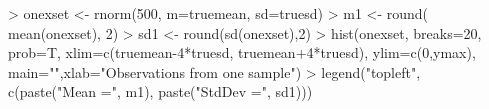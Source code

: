 \begin{Schunk}
\begin{Sinput}
> onexset <- rnorm(500, m=truemean, sd=truesd)
> m1 <- round( mean(onexset), 2)
> sd1 <- round(sd(onexset),2)
> hist(onexset, breaks=20, prob=T, xlim=c(truemean-4*truesd, truemean+4*truesd), ylim=c(0,ymax), main="",xlab="Observations from one sample")
> legend("topleft", c(paste("Mean =", m1), paste("StdDev =", sd1)))
\end{Sinput}
\end{Schunk}
